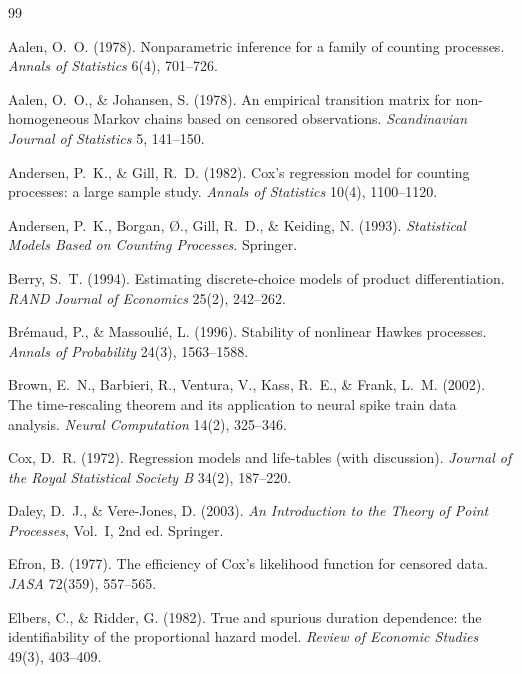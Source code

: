 \documentclass[11pt]{article}
\numberwithin{assumption}{section}
\numberwithin{proposition}{section}
\numberwithin{remark}{section}
\begin{document}
\begin{thebibliography}{99}\small

Aalen, O.~O. (1978). Nonparametric inference for a family of counting
processes. \emph{Annals of Statistics} 6(4), 701--726.

Aalen, O.~O., \& Johansen, S. (1978). An empirical transition matrix for
non-homogeneous Markov chains based on censored observations.
\emph{Scandinavian Journal of Statistics} 5, 141--150.

Andersen, P.~K., \& Gill, R.~D. (1982). Cox's regression model for counting
processes: a large sample study. \emph{Annals of Statistics} 10(4),
1100--1120.

Andersen, P.~K., Borgan, {\O}., Gill, R.~D., \& Keiding, N. (1993).
\emph{Statistical Models Based on Counting Processes}. Springer.

Berry, S.~T. (1994). Estimating discrete-choice models of product
differentiation. \emph{RAND Journal of Economics} 25(2), 242--262.

Br\'emaud, P., \& Massouli\'e, L. (1996). Stability of nonlinear Hawkes
processes. \emph{Annals of Probability} 24(3), 1563--1588.

Brown, E.~N., Barbieri, R., Ventura, V., Kass, R.~E., \& Frank, L.~M.
(2002). The time-rescaling theorem and its application to neural spike
train data analysis. \emph{Neural Computation} 14(2), 325--346.

Cox, D.~R. (1972). Regression models and life-tables (with discussion).
\emph{Journal of the Royal Statistical Society B} 34(2), 187--220.

Daley, D.~J., \& Vere-Jones, D. (2003). \emph{An Introduction to the Theory
of Point Processes}, Vol.~I, 2nd ed. Springer.

Efron, B. (1977). The efficiency of Cox's likelihood function for censored
data. \emph{JASA} 72(359), 557--565.

Elbers, C., \& Ridder, G. (1982). True and spurious duration dependence:
the identifiability of the proportional hazard model. \emph{Review of
Economic Studies} 49(3), 403--409.


\end{thebibliography}
\end{document}
